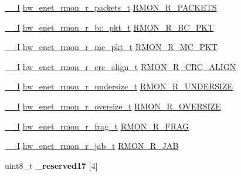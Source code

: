 \begin{DoxyCompactItemize}
\item 
\hyperlink{core__sc300_8h_af63697ed9952cc71e1225efe205f6cd3}{\+\_\+\+\_\+I} \hyperlink{union__hw__enet__rmon__r__packets}{hw\+\_\+enet\+\_\+rmon\+\_\+r\+\_\+packets\+\_\+t} \hyperlink{struct__hw__enet_ae2ad9c6d0c01820623bf3d6ef2843b07}{R\+M\+O\+N\+\_\+\+R\+\_\+\+P\+A\+C\+K\+E\+TS}
\item 
\hyperlink{core__sc300_8h_af63697ed9952cc71e1225efe205f6cd3}{\+\_\+\+\_\+I} \hyperlink{union__hw__enet__rmon__r__bc__pkt}{hw\+\_\+enet\+\_\+rmon\+\_\+r\+\_\+bc\+\_\+pkt\+\_\+t} \hyperlink{struct__hw__enet_ab336e389bf00fbd039ed91f18dcd2162}{R\+M\+O\+N\+\_\+\+R\+\_\+\+B\+C\+\_\+\+P\+KT}
\item 
\hyperlink{core__sc300_8h_af63697ed9952cc71e1225efe205f6cd3}{\+\_\+\+\_\+I} \hyperlink{union__hw__enet__rmon__r__mc__pkt}{hw\+\_\+enet\+\_\+rmon\+\_\+r\+\_\+mc\+\_\+pkt\+\_\+t} \hyperlink{struct__hw__enet_a74e87693fe858d33b6dea0e5f4cab031}{R\+M\+O\+N\+\_\+\+R\+\_\+\+M\+C\+\_\+\+P\+KT}
\item 
\hyperlink{core__sc300_8h_af63697ed9952cc71e1225efe205f6cd3}{\+\_\+\+\_\+I} \hyperlink{union__hw__enet__rmon__r__crc__align}{hw\+\_\+enet\+\_\+rmon\+\_\+r\+\_\+crc\+\_\+align\+\_\+t} \hyperlink{struct__hw__enet_a5c2104be78b9aa53b014c7c50b10443a}{R\+M\+O\+N\+\_\+\+R\+\_\+\+C\+R\+C\+\_\+\+A\+L\+I\+GN}
\item 
\hyperlink{core__sc300_8h_af63697ed9952cc71e1225efe205f6cd3}{\+\_\+\+\_\+I} \hyperlink{union__hw__enet__rmon__r__undersize}{hw\+\_\+enet\+\_\+rmon\+\_\+r\+\_\+undersize\+\_\+t} \hyperlink{struct__hw__enet_ac567be088e1a146524e825b3dad2d1df}{R\+M\+O\+N\+\_\+\+R\+\_\+\+U\+N\+D\+E\+R\+S\+I\+ZE}
\item 
\hyperlink{core__sc300_8h_af63697ed9952cc71e1225efe205f6cd3}{\+\_\+\+\_\+I} \hyperlink{union__hw__enet__rmon__r__oversize}{hw\+\_\+enet\+\_\+rmon\+\_\+r\+\_\+oversize\+\_\+t} \hyperlink{struct__hw__enet_a89424829f10197b4b03621cebaf32453}{R\+M\+O\+N\+\_\+\+R\+\_\+\+O\+V\+E\+R\+S\+I\+ZE}
\item 
\hyperlink{core__sc300_8h_af63697ed9952cc71e1225efe205f6cd3}{\+\_\+\+\_\+I} \hyperlink{union__hw__enet__rmon__r__frag}{hw\+\_\+enet\+\_\+rmon\+\_\+r\+\_\+frag\+\_\+t} \hyperlink{struct__hw__enet_aef5ee941581c914d936572ef957dedae}{R\+M\+O\+N\+\_\+\+R\+\_\+\+F\+R\+AG}
\item 
\hyperlink{core__sc300_8h_af63697ed9952cc71e1225efe205f6cd3}{\+\_\+\+\_\+I} \hyperlink{union__hw__enet__rmon__r__jab}{hw\+\_\+enet\+\_\+rmon\+\_\+r\+\_\+jab\+\_\+t} \hyperlink{struct__hw__enet_a5b8bdaa740eace77903b7e078fe00b17}{R\+M\+O\+N\+\_\+\+R\+\_\+\+J\+AB}
\item 
uint8\+\_\+t {\bfseries \+\_\+reserved17} \mbox{[}4\mbox{]}\hypertarget{struct__hw__enet_ab6c89bbabf7a890b2cc7867c0b63dbbb}{}\label{struct__hw__enet_ab6c89bbabf7a890b2cc7867c0b63dbbb}


\end{DoxyCompactItemize}
